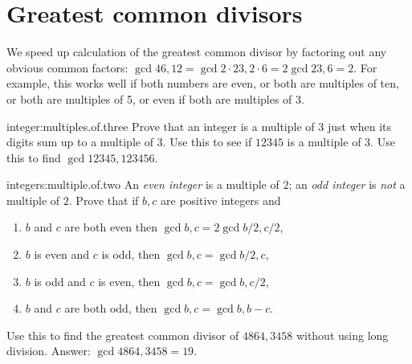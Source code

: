 \section{Greatest common divisors}
We speed up calculation of the greatest common divisor by factoring out any obvious common factors: \(\gcd{46,12}=\gcd{2 \cdot 23,2 \cdot 6}=2 \gcd{23,6}=2\).
For example, this works well if both numbers are even, or both are multiples of ten, or both are multiples of 5, or even if both are multiples of 3.
\begin{problem}{integer:multiples.of.three}
Prove that an integer is a multiple of 3 just when its digits sum up to a multiple of 3.
Use this to see if \(12345\) is a multiple of \(3\).
Use this to find \(\gcd{12345,123456}\).
\end{problem}
\begin{problem}{integers:multiple.of.two}
An \emph{even integer} is a multiple of \(2\); an \emph{odd integer} is \emph{not} a multiple of \(2\).
Prove that if \(b,c\) are positive integers and 
\begin{enumerate}
\item
\(b\) and \(c\) are both even then \(\gcd{b,c}=2\gcd{b/2,c/2}\),
\item
\(b\) is even and \(c\) is odd, then \(\gcd{b,c}=\gcd{b/2,c}\),
\item
\(b\) is odd and \(c\) is even, then \(\gcd{b,c}=\gcd{b,c/2}\),
\item
\(b\) and \(c\) are both odd, then \(\gcd{b,c}=\gcd{b,b-c}\).
\end{enumerate}
Use this to find the greatest common divisor of \(4864, 3458\) without using long division. Answer: \(\gcd{4864,3458}=19\).
\end{problem}
%    
